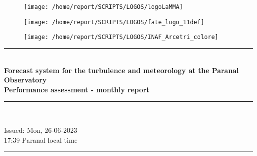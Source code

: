\documentclass[11pt,english]{article}
\newcommand{\HRule}{\rule{\linewidth}{0.5mm}}
\begin{document}
\begin{figure}
\begin{center}
\hspace{1.5cm}
\parbox{5.5cm}{\texttt{[image: /home/report/SCRIPTS/LOGOS/logoLaMMA]}}
\hspace{.3cm}
\parbox{5.5cm}{\texttt{[image: /home/report/SCRIPTS/LOGOS/fate\_logo\_11def]}}
\hspace{.3cm}
\parbox{5.5cm}{\texttt{[image: /home/report/SCRIPTS/LOGOS/INAF\_Arcetri\_colore]}}
\hspace{.1cm}
\vspace{1.2cm}
\end{center}
\end{figure}

\begin{center}
\HRule \\[0.4cm]
\Huge{\textbf{Forecast system for the turbulence and meteorology at the Paranal Observatory}}
\\[0.4cm]
\LARGE{\textbf{Performance assessment - monthly report}}
\HRule \\[0.4cm]
\end{center}

\begin{center}
\vspace{2cm}\Huge{Issued: Mon, 26-06-2023\\ 17:39 Paranal local time}
\HRule \\[0.1cm]
\end{center}

\clearpage
\end{document}
